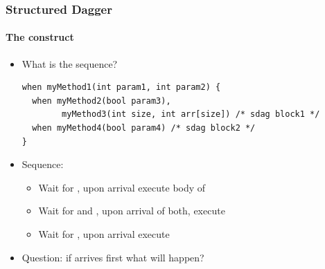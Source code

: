 \begin{frame}[fragile]
  \frametitle{Structured Dagger}
  \framesubtitle{The  construct}
\begin{itemize}
  \item What is the sequence?
  \begin{lstlisting}[basicstyle=\scriptsize]
when myMethod1(int param1, int param2) {
  when myMethod2(bool param3),
        myMethod3(int size, int arr[size]) /* sdag block1 */
  when myMethod4(bool param4) /* sdag block2 */
}
  \end{lstlisting}
  \pause
  \item Sequence:
    \begin{itemize}
      \item Wait for , upon arrival execute body of 
        \pause
      \item Wait for  and , upon arrival of
        both, execute 
        \pause
      \item Wait for , upon arrival execute 
    \end{itemize}
  \item Question: if  arrives first what will happen?
\end{itemize}

\end{frame}



